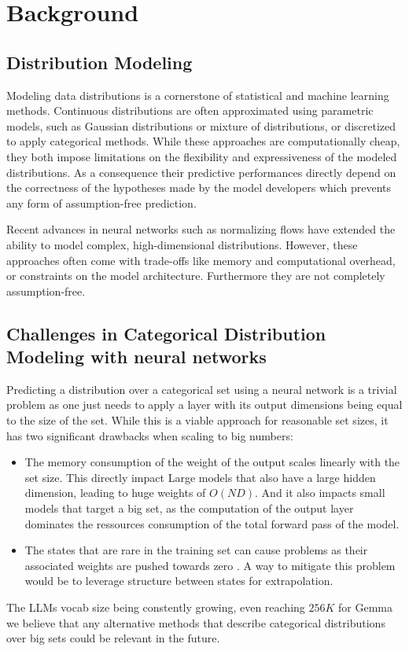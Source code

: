 \documentclass{article}
\begin{document}
\section{Background}

\subsection{Distribution Modeling}
Modeling data distributions is a cornerstone of statistical and machine learning methods. Continuous distributions are often approximated using parametric models, such as Gaussian distributions or mixture of distributions, or discretized to apply categorical methods. While these approaches are computationally cheap, they both impose limitations on the flexibility and expressiveness of the modeled distributions. As a consequence their predictive performances directly depend on the correctness of the hypotheses made by the model developers which prevents any form of assumption-free prediction.

Recent advances in neural networks such as normalizing flows \cite{rezende2016variationalinferencenormalizingflow} have extended the ability to model complex, high-dimensional distributions. However, these approaches often come with trade-offs like memory and computational overhead, or constraints on the model architecture. Furthermore they are not completely assumption-free.

\subsection{Challenges in Categorical Distribution Modeling with neural networks}
Predicting a distribution over a categorical set using a neural network is a trivial problem as one just needs to apply a layer with its output dimensions being equal to the size of the set. While this is a viable approach for reasonable set sizes, it has two significant drawbacks when scaling to big numbers:
\begin{itemize}
\item The memory consumption of the weight of the output scales linearly with the set size. This directly impact Large models that also have a large hidden dimension, leading to huge weights of $O(ND)$. And it also impacts small models that target a big set, as the computation of the output layer dominates the ressources consumption of the total forward pass of the model.
\item The states that are rare in the training set can cause problems as their associated weights are pushed towards zero \cite{land2024fishingmagikarp}. A way to mitigate this problem would be to leverage structure between states for extrapolation.
\end{itemize}
The LLMs vocab size being constently growing, even reaching $256K$ for Gemma \cite{gemmateam2024gemma} we believe that any alternative methods that describe categorical distributions over big sets could be relevant in the future.
\end{document}
